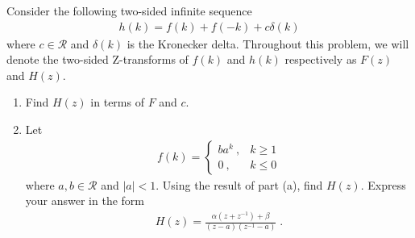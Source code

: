 \item

Consider the following two-sided infinite sequence
\begin{align*}
    h(k) = f(k) + f(-k) + c \delta(k)
\end{align*}
where $c \in \mathcal{R}$ and $\delta(k)$ is the Kronecker delta. Throughout this problem, we will denote the two-sided Z-transforms of $f(k)$ and $h(k)$ respectively as $F(z)$ and $H(z)$.

\begin{enumerate}
    \item
    Find $H(z)$ in terms of $F$ and $c$.
    
    \item
    Let
    \begin{align*}
        f(k) = \begin{cases}
            b a^k \ , & k \geq 1 \\
            0 \ , & k \leq 0
        \end{cases}
    \end{align*}
    where $a,b \in \mathcal{R}$ and $|a| < 1$. Using the result of part (a), find $H(z)$. Express your answer in the form
    \begin{align*}
        H(z) = \frac{\alpha(z + z^{-1}) + \beta}{(z-a)(z^{-1}-a)} \; .
    \end{align*}
\end{enumerate}

